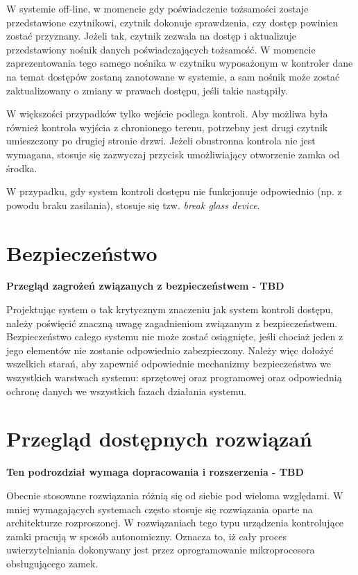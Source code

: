 		W systemie off-line, w momencie gdy poświadczenie tożsamości zostaje przedstawione czytnikowi, czytnik dokonuje sprawdzenia, czy dostęp powinien zostać przyznany. Jeżeli tak, czytnik zezwala na dostęp i aktualizuje przedstawiony nośnik danych poświadczających tożsamość. W momencie zaprezentowania tego samego nośnika w czytniku wyposażonym w kontroler dane na temat dostępów zostaną zanotowane w systemie, a sam nośnik może zostać zaktualizowany o zmiany w prawach dostępu, jeśli takie nastąpiły.

		W większości przypadków tylko wejście podlega kontroli. Aby możliwa była również kontrola wyjścia z chronionego terenu, potrzebny jest drugi czytnik umieszczony po drugiej stronie drzwi. Jeżeli obustronna kontrola nie jest wymagana, stosuje się zazwyczaj przycisk umożliwiający otworzenie zamka od środka.

		W przypadku, gdy system kontroli dostępu nie funkcjonuje odpowiednio (np. z powodu braku zasilania), stosuje się tzw. \textit{break glass device}.

	\section{Bezpieczeństwo}
		\textbf{Przegląd zagrożeń związanych z bezpieczeństwem - TBD}

		Projektując system o tak krytycznym znaczeniu jak system kontroli dostępu, należy poświęcić znaczną uwagę zagadnieniom związanym z bezpieczeństwem. Bezpieczeństwo całego systemu nie może zostać osiągnięte, jeśli chociaż jeden z jego elementów nie zostanie odpowiednio zabezpieczony. Należy więc dołożyć wszelkich starań, aby zapewnić odpowiednie mechanizmy bezpieczeństwa we wszystkich warstwach systemu: sprzętowej oraz programowej oraz odpowiednią ochronę danych we wszystkich fazach działania systemu.

	\section{Przegląd dostępnych rozwiązań}
		\textbf{Ten podrozdział wymaga dopracowania i rozszerzenia - TBD}

		Obecnie stosowane rozwiązania różnią się od siebie pod wieloma względami. W mniej wymagających systemach często stosuje się rozwiązania oparte na architekturze rozproszonej. W rozwiązaniach tego typu urządzenia kontrolujące zamki pracują w sposób autonomiczny. Oznacza to, iż cały proces uwierzytelniania dokonywany jest przez oprogramowanie mikroprocesora obsługującego zamek.

